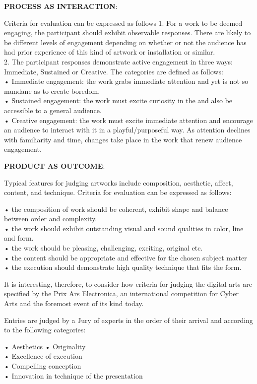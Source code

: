 \textbf{PROCESS AS INTERACTION}: \citep[p.17]{Candy2012}

Criteria for evaluation can be expressed as follows
1. For a work to be deemed engaging, the participant should exhibit observable responses. There are likely to be different levels of engagement depending on whether or not the audience has had prior experience of this kind of artwork or installation or similar.\\
2. The participant responses demonstrate active engagement in three ways: Immediate, Sustained or Creative. The categories are defined as follows:\\
•	Immediate engagement: the work grabs immediate attention and yet is not so mundane as to create boredom.\\
•	Sustained engagement: the work must excite curiosity in the and also be accessible to a general audience.\\
•	Creative engagement: the work must excite immediate attention and encourage an audience to interact with it in a playful/purposeful way. As attention declines with familiarity and time, changes take place in the work that renew audience engagement.

\textbf{PRODUCT AS OUTCOME}: \citep[p.18]{Candy2012}

Typical features for judging artworks include composition, aesthetic, affect, content, and technique. Criteria for evaluation can be expressed as follows:

•	the composition of work should be coherent, exhibit shape and balance between order and complexity.\\
•	the work should exhibit outstanding visual and sound qualities in color, line and form.\\
•	the work should be pleasing, challenging, exciting, original etc.\\
•	the content should be appropriate and effective for the chosen subject matter\\
•	the execution should demonstrate high quality technique that fits the form.

It is interesting, therefore, to consider how criteria for judging the digital arts are specified by the Prix Ars Electronica, an international competition for Cyber Arts and the foremost event of its kind today.

Entries are judged by a Jury of experts in the order of their arrival and according to the following categories:

•	Aesthetics • Originality\\
•	Excellence of execution\\
•	Compelling conception\\
•	Innovation in technique of the presentation

